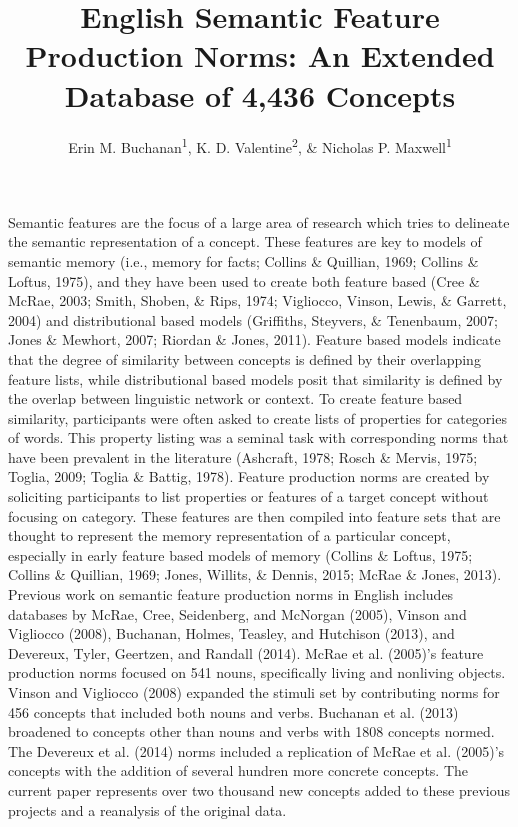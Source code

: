\documentclass[english,,man]{apa6}
\title{English Semantic Feature Production Norms: An Extended Database of 4,436
Concepts}
\author{Erin M. Buchanan\textsuperscript{1}, K. D. Valentine\textsuperscript{2},
\& Nicholas P. Maxwell\textsuperscript{1}}
\date{}
\affiliation{
\vspace{0.5cm}
\textsuperscript{1} Missouri State University\\\textsuperscript{2} University of Missouri}
\theoremstyle{definition}
\theoremstyle{definition}
\theoremstyle{definition}
\theoremstyle{remark}
\begin{document}
\maketitle

Semantic features are the focus of a large area of research which tries
to delineate the semantic representation of a concept. These features
are key to models of semantic memory (i.e., memory for facts; Collins \&
Quillian, 1969; Collins \& Loftus, 1975), and they have been used to
create both feature based (Cree \& McRae, 2003; Smith, Shoben, \& Rips,
1974; Vigliocco, Vinson, Lewis, \& Garrett, 2004) and distributional
based models (Griffiths, Steyvers, \& Tenenbaum, 2007; Jones \& Mewhort,
2007; Riordan \& Jones, 2011). Feature based models indicate that the
degree of similarity between concepts is defined by their overlapping
feature lists, while distributional based models posit that similarity
is defined by the overlap between linguistic network or context. To
create feature based similarity, participants were often asked to create
lists of properties for categories of words. This property listing was a
seminal task with corresponding norms that have been prevalent in the
literature (Ashcraft, 1978; Rosch \& Mervis, 1975; Toglia, 2009; Toglia
\& Battig, 1978). Feature production norms are created by soliciting
participants to list properties or features of a target concept without
focusing on category. These features are then compiled into feature sets
that are thought to represent the memory representation of a particular
concept, especially in early feature based models of memory (Collins \&
Loftus, 1975; Collins \& Quillian, 1969; Jones, Willits, \& Dennis,
2015; McRae \& Jones, 2013). Previous work on semantic feature
production norms in English includes databases by McRae, Cree,
Seidenberg, and McNorgan (2005), Vinson and Vigliocco (2008), Buchanan,
Holmes, Teasley, and Hutchison (2013), and Devereux, Tyler, Geertzen,
and Randall (2014). McRae et al. (2005)'s feature production norms
focused on 541 nouns, specifically living and nonliving objects. Vinson
and Vigliocco (2008) expanded the stimuli set by contributing norms for
456 concepts that included both nouns and verbs. Buchanan et al. (2013)
broadened to concepts other than nouns and verbs with 1808 concepts
normed. The Devereux et al. (2014) norms included a replication of McRae
et al. (2005)'s concepts with the addition of several hundren more
concrete concepts. The current paper represents over two thousand new
concepts added to these previous projects and a reanalysis of the
original data.
\end{document}
